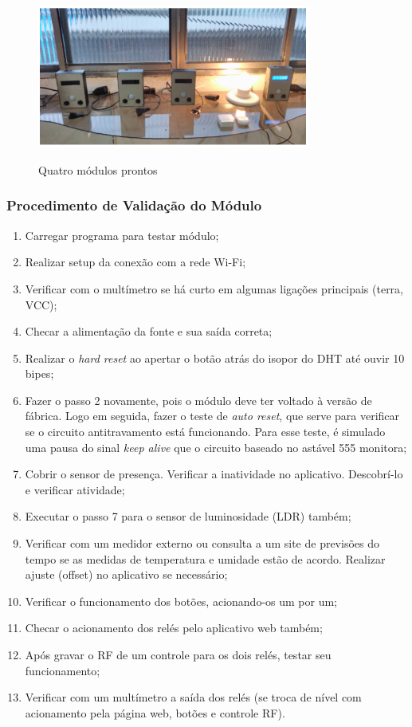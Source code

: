 \begin{enumerate}
	\begin{figure}[H]
		\centering
		\caption{Quatro módulos prontos}
		\includegraphics[width=0.8\textwidth]{QuatroModulos}
		\label{fig:QuatroModulos}
	\end{figure}

\end{enumerate}

\subsubsection {Procedimento de Validação do Módulo}
\begin{enumerate}
	\item Carregar programa para testar módulo;
	\item Realizar setup da conexão com a rede Wi-Fi;
	\item Verificar com o multímetro se há curto em algumas ligações principais (terra, VCC);
	\item Checar a alimentação da fonte e sua saída correta;
	\item Realizar o \emph{hard reset} ao apertar o botão atrás do isopor do DHT até ouvir 10 bipes;
	\item Fazer o passo 2 novamente, pois o módulo deve ter voltado à versão de fábrica. Logo em seguida, fazer o teste de \emph{auto reset}, que serve para verificar se o circuito antitravamento está funcionando. Para esse teste, é simulado uma pausa do sinal \emph{keep alive} que o circuito baseado no astável 555 monitora;
	\item Cobrir o sensor de presença. Verificar a inatividade no aplicativo. Descobrí-lo e verificar atividade;
	\item Executar o passo 7 para o sensor de luminosidade (LDR) também;
	\item Verificar com um medidor externo ou consulta a um site de previsões do tempo se as medidas de temperatura e umidade estão de acordo. Realizar ajuste (offset) no aplicativo se necessário;
	\item Verificar o funcionamento dos botões, acionando-os um por um;
	\item Checar o acionamento dos relés pelo aplicativo web também;
	\item Após gravar o RF de um controle para os dois relés, testar seu funcionamento;
	\item Verificar com um multímetro a saída dos relés (se troca de nível com acionamento pela página web, botões e controle RF).
\end{enumerate}
